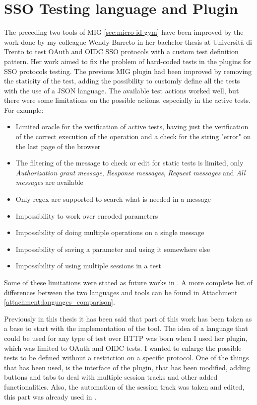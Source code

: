 \section{SSO Testing language and Plugin}
The preceding two tools of MIG \ref{sec:micro-id-gym} have been improved by the work done by my colleague Wendy Barreto \cite{wendy_barreto} in her bachelor thesis at Università di Trento to test \gls{OAuth} and \gls{OIDC} SSO protocols with a custom test definition pattern. Her work aimed to fix the problem of hard-coded tests in the plugins for SSO protocols testing. The previous MIG plugin had been improved by removing the staticity of the test, adding the possibility to customly define all the tests with the use of a JSON language.
The available test actions worked well, but there were some limitations on the possible actions, especially in the active tests. For example:
\begin{itemize}
    \item Limited oracle for the verification of active tests, having just the verification of the correct execution of the operation and a check for the string "error" on the last page of the browser
    \item The filtering of the message to check or edit for static tests is limited, only \textit{Authorization grant message}, \textit{Response messages}, \textit{Request messages} and \textit{All messages} are available
    \item Only regex are supported to search what is needed in a message
    \item Impossibility to work over encoded parameters
    \item Impossibility of doing multiple operations on a single message
    \item Impossibility of saving a parameter and using it somewhere else
    \item Impossibility of using multiple sessions in a test
\end{itemize}
Some of these limitations were stated as future works in \cite{wendy_barreto}. A more complete list of differences between the two languages and tools can be found in Attachment \ref{attachment:languages_comparison}.

Previously in this thesis it has been said that part of this work has been taken as a base to start with the implementation of the tool. The idea of a language that could be used for any type of test over HTTP was born when I used her plugin, which was limited to \gls{OAuth} and \gls{OIDC} tests. I wanted to enlarge the possible tests to be defined without a restriction on a specific protocol. 
One of the things that has been used, is the interface of the plugin, that has been modified, adding buttons and tabs to deal with multiple \gls{session track}s and other added functionalities. Also, the automation of the \gls{session track} was taken and edited, this part was already used in \cite{claudio_grisenti,stefano_facchini}.

